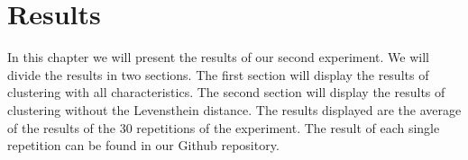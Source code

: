 \documentclass[../../main]{subfiles}
\begin{document}
\clearpage
\section{Results}
\label{ch:results_rq2}
In this chapter we will present the results of our second experiment.
We will divide the results in two sections. 
The first section will display the results of clustering with all characteristics.
The second section will display the results of clustering without the Levensthein distance.
\newline
The results displayed are the average of the results of the 30 repetitions of the experiment.
The result of each single repetition can be found in our Github repository\cite{rbasarat-repo}.
\end{document}
